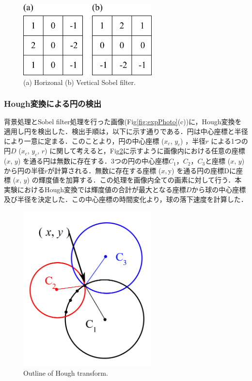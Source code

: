 \begin{figure}[h]
    \centering
    \includegraphics[width=7.0cm,clip]{2-Methods/sobel-filter.png}
    \caption{(a) Horizonal (b) Vertical Sobel filter.}
    \label{fig:sobel}
\end{figure}

\newpage

\subsubsection{Hough変換による円の検出}
背景処理とSobel filter処理を行った画像(Fig\ref{fig:expPhoto}(c))に，Hough変換を適用し円を検出した．検出手順は，以下に示す通りである．円は中心座標と半径により一意に定まる．このことより，円の中心座標 ($x_c$, $y_c$) ，半径$r$ による1つの円$D$ ($x_c$, $y_c$, $r$) に関して考えると，Fig\ref{fig:hough}に示すように画像内における任意の座標 ($x$, $y$) を通る円は無数に存在する．3つの円の中心座標$C_1$，$C_2$，$C_3$と座標 ($x$, $y$) から円の半径$r$が計算される．無数に存在する座標 ($x, $y) を通る円の座標Dに座標 ($x$, $y$) の輝度値を加算する．この処理を画像内全ての画素に対して行う．本実験におけるHough変換では輝度値の合計が最大となる座標$D$から球の中心座標及び半径を決定した．この中心座標の時間変化より，球の落下速度を計算した．

\begin{figure}[h]
    \centering
    \includegraphics[width=7.0cm,clip]{2-Methods/hough.PNG}
    \caption{Outline of Hough transform.}
    \label{fig:hough}
\end{figure}
